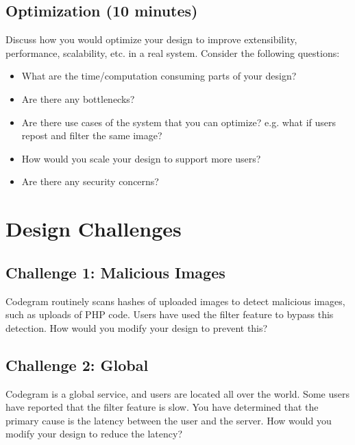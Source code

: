 \documentclass{csse4400}
\begin{document}
\subsection*{Optimization (10 minutes)}
Discuss how you would optimize your design to improve extensibility, performance, scalability, etc. in a real system.
Consider the following questions:
\begin{itemize}
    \item What are the time/computation consuming parts of your design?
    \item Are there any bottlenecks?
    \item Are there use cases of the system that you can optimize? e.g. what if users repost and filter the same image?
    \item How would you scale your design to support more users?
    \item Are there any security concerns?
\end{itemize}

\section{Design Challenges}

\subsection*{Challenge 1: Malicious Images}
Codegram routinely scans hashes of uploaded images to detect malicious images, such as uploads of PHP code.
Users have used the filter feature to bypass this detection.
How would you modify your design to prevent this?

\subsection*{Challenge 2: Global}
Codegram is a global service, and users are located all over the world.
Some users have reported that the filter feature is slow.
You have determined that the primary cause is the latency between the user and the server.
How would you modify your design to reduce the latency?
\end{document}
